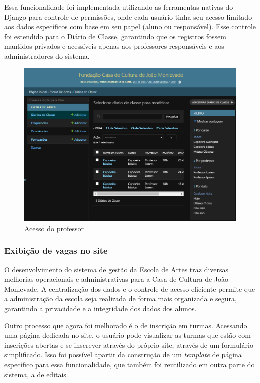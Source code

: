 Essa funcionalidade foi implementada utilizando as ferramentas nativas do Django para controle de permissões, onde cada usuário tinha seu acesso limitado aos dados específicos com base em seu papel (aluno ou responsável). Esse controle foi estendido para o Diário de Classe, garantindo que os registros fossem mantidos privados e acessíveis apenas aos professores responsáveis e aos administradores do sistema.

\begin{figure}[htb]
	\caption{\label{fig_grafico}Acesso do professor}
	\begin{center}
	    \includegraphics[scale=0.3]{./img/admin_professor.png}
	\end{center}
\end{figure}

\subsubsection{Exibição de vagas no site}

O desenvolvimento do sistema de gestão da Escola de Artes traz diversas melhorias operacionais e administrativas para a Casa de Cultura de João Monlevade. A centralização dos dados e o controle de acesso eficiente permite que a administração da escola seja realizada de forma mais organizada e segura, garantindo a privacidade e a integridade dos dados dos alunos.

Outro processo que agora foi melhorado é o de inscrição em turmas. Acessando uma página dedicada no site, o usuário pode visualizar as turmas que estão com inscrições abertas e se inscrever através do próprio site, através de um formulário simplificado. Isso foi possível apartir da construção de um \textit{template} de página específico para essa funcionalidade, que também foi reutilizado em outra parte do sistema, a de editais.

